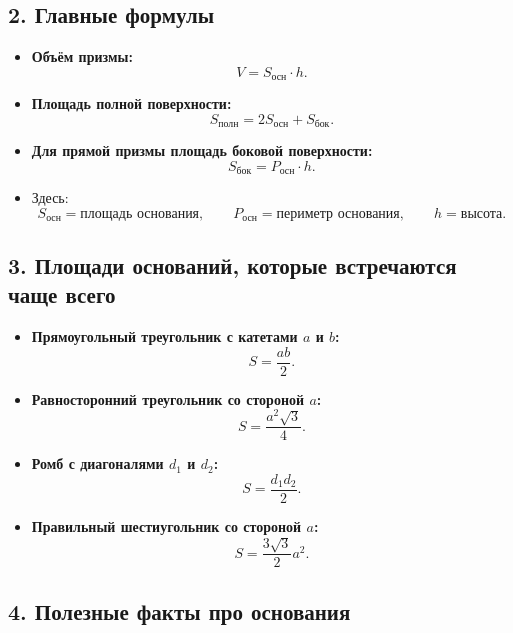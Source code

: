\documentclass[a4paper,12pt]{article}
\newcommand{\Area}{S}
\newcommand{\Vol}{V}
\newcommand{\per}{P}
\begin{document}
\subsection*{2. Главные формулы}

\begin{itemize}
    \item \textbf{Объём призмы:}
    \[
    \Vol=\Area_{\text{осн}}\cdot h.
    \]
    
    \item \textbf{Площадь полной поверхности:}
    \[
    \Area_{\text{полн}}=2\Area_{\text{осн}}+\Area_{\text{бок}}.
    \]
    
    \item \textbf{Для прямой призмы площадь боковой поверхности:}
    \[
    \Area_{\text{бок}}=\per_{\text{осн}}\cdot h.
    \]
    
    \item Здесь:
    \[
    \Area_{\text{осн}}=\text{площадь основания},\qquad
    \per_{\text{осн}}=\text{периметр основания},\qquad
    h=\text{высота}.
    \]
\end{itemize}

\subsection*{3. Площади оснований, которые встречаются чаще всего}

\begin{itemize}
    \item \textbf{Прямоугольный треугольник с катетами $a$ и $b$:}
    \[
    \Area=\frac{ab}{2}.
    \]
    
    \item \textbf{Равносторонний треугольник со стороной $a$:}
    \[
    \Area=\frac{a^{2}\sqrt{3}}{4}.
    \]
    
    \item \textbf{Ромб с диагоналями $d_1$ и $d_2$:}
    \[
    \Area=\frac{d_1d_2}{2}.
    \]
    
    \item \textbf{Правильный шестиугольник со стороной $a$:}
    \[
    \Area=\frac{3\sqrt{3}}{2}a^2.
    \]
\end{itemize}

\subsection*{4. Полезные факты про основания}
\end{document}
